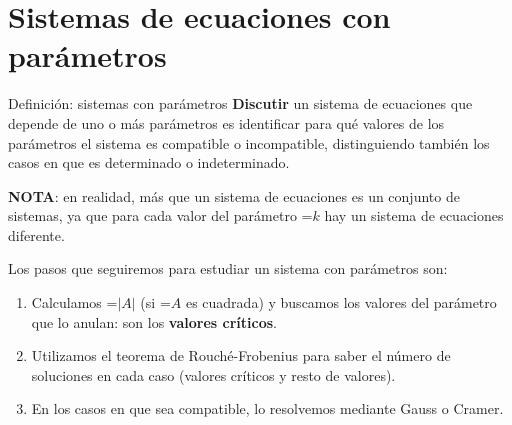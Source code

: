 \documentclass[11pt,a4paper]{article}
\newcommand{\fmm}[1]{\setbox0=\hbox{$#1$}\ifdim\wd0>\linewidth\fmdisp{#1}\else\mbox{\box0}\fi}
\newcommand{\fmdisp}[1]{\[\setbox2=\hbox{$\displaystyle #1$}\ifdim\wd2>\linewidth\resizebox{\linewidth}{!}{\box2}\else\box2\fi\]}
\newcommand{\fmuline}[1]{\textbf{\color{fmaccent}#1}}
\begin{document}
\section{Sistemas de ecuaciones con parámetros}\hypertarget{sec6}{}

\begin{fmdef}{Definición: sistemas con parámetros}
\textbf{Discutir} un sistema de ecuaciones que depende de uno o más parámetros es identificar para qué valores de los parámetros el sistema es compatible o incompatible, distinguiendo también los casos en que es determinado o indeterminado.

\begin{fmnote}\fmuline{NOTA}: en realidad, más que un sistema de ecuaciones es un conjunto de sistemas, ya que para cada valor del parámetro \fmm{k} hay un sistema de ecuaciones diferente.\end{fmnote}

Los pasos que seguiremos para estudiar un sistema con parámetros son:

\begin{enumerate}
\item Calculamos \fmm{|A|} (si \fmm{A} es cuadrada) y buscamos los valores del parámetro que lo anulan: son los \textbf{valores críticos}.
\item Utilizamos el teorema de Rouché-Frobenius para saber el número de soluciones en cada caso (valores críticos y resto de valores).
\item En los casos en que sea compatible, lo resolvemos mediante Gauss o Cramer.
\end{enumerate}
\end{fmdef}
\end{document}
